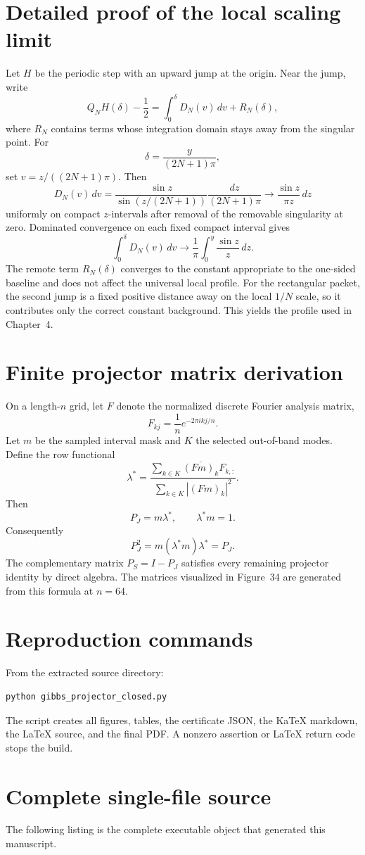 \documentclass[11pt,oneside]{book}
\theoremstyle{remark}\newtheorem{remark}[theorem]{Remark}\newtheorem{boundary}[theorem]{Boundary}\newtheorem{certificate}[theorem]{Certificate}
\begin{document}
\chapter{Detailed proof of the local scaling limit}
Let $H$ be the periodic step with an upward jump at the origin.  Near the jump, write
\[
Q_NH(\delta)-\frac12
=\int_0^\delta D_N(v)\,dv+R_N(\delta),
\]
where $R_N$ contains terms whose integration domain stays away from the singular point.  For
\[
\delta=\frac{y}{(2N+1)\pi},
\]
set $v=z/((2N+1)\pi)$.  Then
\[
D_N(v)\,dv
=\frac{\sin z}{\sin(z/(2N+1))}\frac{dz}{(2N+1)\pi}
\longrightarrow
\frac{\sin z}{\pi z}\,dz
\]
uniformly on compact $z$-intervals after removal of the removable singularity at zero.  Dominated convergence on each fixed compact interval gives
\[
\int_0^\delta D_N(v)\,dv
\longrightarrow
\frac1\pi\int_0^y\frac{\sin z}{z}\,dz.
\]
The remote term $R_N(\delta)$ converges to the constant appropriate to the one-sided baseline and does not affect the universal local profile.  For the rectangular packet, the second jump is a fixed positive distance away on the local $1/N$ scale, so it contributes only the correct constant background.  This yields the profile used in Chapter~4.

\chapter{Finite projector matrix derivation}
On a length-$n$ grid, let $F$ denote the normalized discrete Fourier analysis matrix,
\[
F_{kj}=\frac1n e^{-2\pi ikj/n}.
\]
Let $m$ be the sampled interval mask and $K$ the selected out-of-band modes.  Define the row functional
\[
\lambda^*=
\frac{\sum_{k\in K}\overline{(Fm)_k}F_{k,:}}
{\sum_{k\in K}|(Fm)_k|^2}.
\]
Then
\[
P_J=m\lambda^*,
\qquad
\lambda^*m=1.
\]
Consequently
\[
P_J^2=m(\lambda^*m)\lambda^*=P_J.
\]
The complementary matrix $P_S=I-P_J$ satisfies every remaining projector identity by direct algebra.  The matrices visualized in Figure~34 are generated from this formula at $n=64$.

\chapter{Reproduction commands}
From the extracted source directory:
\begin{lstlisting}
python gibbs_projector_closed.py
\end{lstlisting}
The script creates all figures, tables, the certificate JSON, the KaTeX markdown, the LaTeX source, and the final PDF.  A nonzero assertion or LaTeX return code stops the build.

\chapter{Complete single-file source}
The following listing is the complete executable object that generated this manuscript.

\end{document}
